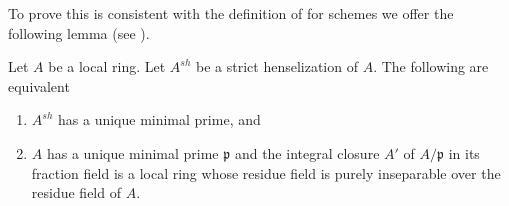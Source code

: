 \noindent
To prove this is consistent with the definition of \cite{EGA}
for schemes we offer the following lemma (see
\cite[Lemma 2.2]{Etale-coverings}).

\begin{lemma}
\label{lemma-geometrically-unibranch}
Let $A$ be a local ring. Let $A^{sh}$ be a strict henselization of $A$.
The following are equivalent
\begin{enumerate}
\item $A^{sh}$ has a unique minimal prime, and
\item $A$ has a unique minimal prime $\mathfrak p$ and
the integral closure $A'$ of $A/\mathfrak p$ in its fraction field is a
local ring whose residue field is purely inseparable over the residue
field of $A$.
\end{enumerate}
\end{lemma}

